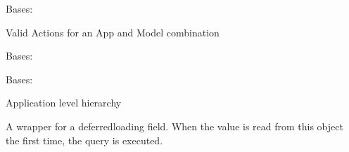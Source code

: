 \documentclass[letterpaper,10pt,english]{sphinxmanual}
\begin{document}
\begin{fulllineitems}
\label{\detokenize{rbac:rbac.models.RBACAppModelAction}}
Bases: 

Valid Actions for an App and Model combination

\begin{fulllineitems}
\label{\detokenize{rbac:rbac.models.RBACAppModelAction.DoesNotExist}}
Bases: 

\end{fulllineitems}


\begin{fulllineitems}
\label{\detokenize{rbac:rbac.models.RBACAppModelAction.MultipleObjectsReturned}}
Bases: 

\end{fulllineitems}


\begin{fulllineitems}
\label{\detokenize{rbac:rbac.models.RBACAppModelAction.app}}
Application level hierarchy

\end{fulllineitems}


\begin{fulllineitems}
\label{\detokenize{rbac:rbac.models.RBACAppModelAction.id}}
A wrapper for a deferred\sphinxhyphen{}loading field. When the value is read from this
object the first time, the query is executed.


\end{fulllineitems}
\end{fulllineitems}
\end{document}
